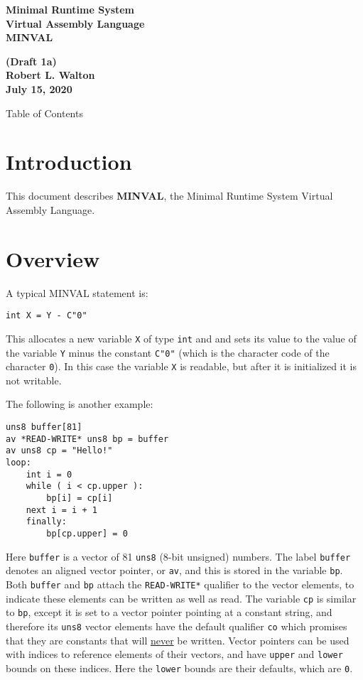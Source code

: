 \documentclass[12pt]{article}
\makeatletter
\renewcommand\tableofcontents{%
    \begin{list}{}%
	     {\setlength{\itemsep}{0in}%
	      \setlength{\topsep}{0in}%
	      \setlength{\parsep}{1ex}%
	      \setlength{\labelwidth}{0in}%
	      \setlength{\baselineskip}{1.5ex}%
	      \setlength{\leftmargin}{0.8in}%
	      \setlength{\rightmargin}{0.8in}}%
    \item\@starttoc{toc}%
    \end{list}}
\newcommand{\key}[1]{{\rm \bfseries #1}}
\newenvironment{indpar}[1][0.3in]%
	{\begin{list}{}%
		     {\setlength{\itemsep}{0in}%
		      \setlength{\topsep}{0in}%
		      \setlength{\parsep}{1ex}%
		      \setlength{\labelwidth}{#1}%
		      \setlength{\leftmargin}{#1}%
		      \addtolength{\leftmargin}{\labelsep}}%
	 \item}%
	{\end{list}}
\makeatother
\begin{document}
        
\begin{center}
\Large \bf
Minimal Runtime System\\
Virtual Assembly Language\\[0.5ex]
\huge \bf
MINVAL
\end{center}
\begin{center}
\large \bf
(Draft 1a)
\\[0.5ex]
Robert L. Walton\\
July 15, 2020

\bigskip
 
Table of Contents
\end{center}

\bigskip

\tableofcontents 

\newpage

\section{Introduction}

This document describes \key{MINVAL}, the Minimal Runtime System Virtual
Assembly Language.

\section{Overview}

A typical MINVAL statement is:
\begin{indpar}\begin{verbatim}
int X = Y - C"0"
\end{verbatim}\end{indpar}
This allocates a new variable {\tt X} of type {\tt int} and
and sets its value to the value of the
variable {\tt Y} minus the constant {\tt C"0"} (which is
the character code of the character {\tt 0}).
In this case the variable {\tt X} is readable, but after it is
initialized it is not writable.

The following is another example:
\begin{indpar}\begin{verbatim}
uns8 buffer[81]
av *READ-WRITE* uns8 bp = buffer
av uns8 cp = "Hello!"
loop:
    int i = 0
    while ( i < cp.upper ):
        bp[i] = cp[i]
	next i = i + 1
    finally:
        bp[cp.upper] = 0
\end{verbatim}\end{indpar}

Here {\tt buffer} is a vector of 81 {\tt uns8} (8-bit unsigned) numbers.
The label {\tt buffer} denotes an aligned vector pointer, or {\tt av},
and this is stored in the variable {\tt bp}.  Both {\tt buffer}
and {\tt bp} attach the {\tt *READ-WRITE*} qualifier to the vector elements,
to indicate these elements can be written as well as read.
The variable {\tt cp} is
similar to {\tt bp}, except it is set to a vector pointer pointing at
a constant string, and therefore its {\tt uns8} vector elements have
the default qualifier {\tt co} which promises that they are constants that will
\underline{never} be written.  Vector pointers can be used with indices
to reference elements of their vectors, and have {\tt upper} and
{\tt lower} bounds on these indices.  Here the {\tt lower} bounds
are their defaults, which are {\tt 0}.
\end{document}
